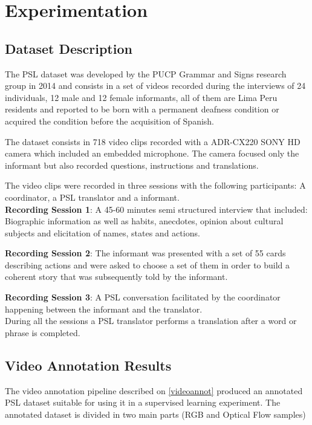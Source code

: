 \documentclass[twocolumn,conference]{article}
\begin{document}
\section{Experimentation}\label{experimentation}
\subsection{Dataset Description \cite{lsp_dataset}}\label{datasetdesc}
The PSL dataset was developed by the PUCP Grammar and Signs research group in 2014 and consists in a set of videos recorded during the interviews of 24 individuals, 12 male and 12 female informants, all of them are Lima Peru residents and reported to be born with a permanent deafness condition or acquired the condition before the acquisition of Spanish. 

The dataset consists in 718 video clips recorded with a ADR-CX220 SONY HD camera which included an embedded microphone. The camera focused only the informant but also recorded questions, instructions and translations.

The video clips were recorded in three sessions with the following participants: A coordinator, a PSL \cite{lsp_2015} translator and a informant.\\

\textbf{Recording Session 1}: A 45-60 minutes semi structured interview that included: Biographic information as well as habits, anecdotes, opinion about cultural subjects and elicitation of names, states and actions. 

\textbf{Recording Session 2}: The informant was presented with a set of 55 cards describing actions and were asked to choose a set of them in order to build a coherent story that was subsequently told by the informant.

\textbf{Recording Session 3}: A PSL \cite{lsp_2015} conversation facilitated by the coordinator happening between the informant and the translator.\\

During all the sessions a PSL \cite{lsp_2015} translator performs a translation after a word or phrase is completed.

\subsection{Video Annotation Results}\label{video-annotation-results}
The video annotation pipeline described on \ref{videoannot} produced an annotated PSL dataset suitable for using it in a supervised learning experiment. The annotated dataset is divided in two main parts (RGB and Optical Flow samples)
\end{document}
